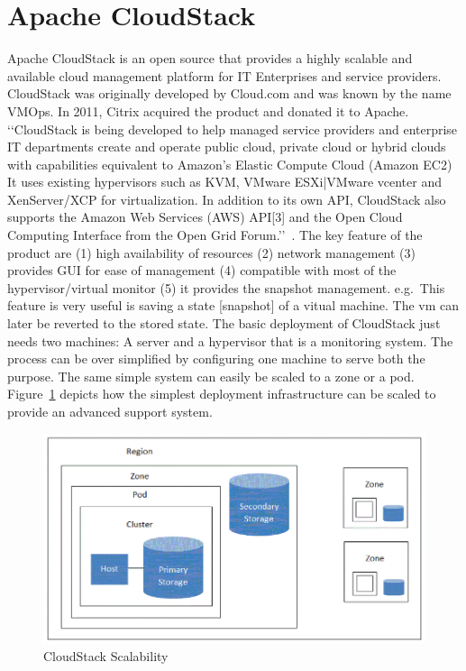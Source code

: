 
\section{Apache CloudStack}

Apache CloudStack is an open source that provides a highly scalable
and available cloud management platform for IT Enterprises and service
providers. CloudStack was originally developed by Cloud.com and was
known by the name VMOps.  In 2011, Citrix acquired the product and
donated it to Apache.
‘‘CloudStack is being developed to help managed service providers and
enterprise IT departments create and operate public cloud, private
cloud or hybrid clouds with capabilities equivalent to Amazon's
Elastic Compute Cloud (Amazon EC2) It uses existing hypervisors such
as KVM, VMware ESXi|VMware vcenter and XenServer/XCP for
virtualization. In addition to its own API, CloudStack also supports
the Amazon Web Services (AWS) API[3] and the Open Cloud Computing
Interface from the Open Grid Forum.’’~\cite{hid-sp18-417-wiki-cloudStack}.
The key feature of the product are 
 (1) high availability of resources
 (2) network management
 (3) provides GUI for ease of management
 (4) compatible with most of the hypervisor/virtual monitor
 (5) it provides the snapshot management. e.g.\ This feature is 
very useful is saving a state [snapshot] of a vitual machine. 
The vm can later be reverted to the stored state.  
The basic deployment of CloudStack just needs two machines: 
 A server and a hypervisor that is a monitoring system.  The process
can be over simplified by configuring one machine to serve both the
purpose.
The same simple system can easily be scaled to a zone or a pod.
Figure~\ref{F:cloudstack-scalabuility} depicts how the simplest
deployment infrastructure can be scaled to provide an advanced support
system.

\begin{figure}[htb]
\includegraphics[width=\textwidth]{images/hid-sp18-417-cloudstack.png}
\caption{CloudStack Scalability~\cite{hid-sp18-417-cloudstack-scaling}}
\label{F:cloudstack-scalabuility}
\end{figure}
